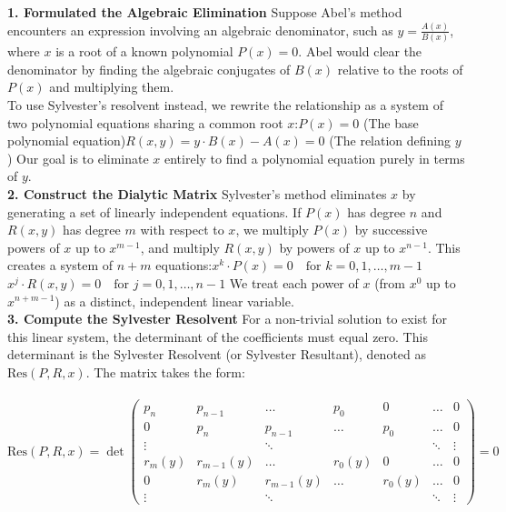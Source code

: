 {\bf 1. Formulated the Algebraic Elimination} 
Suppose Abel's method encounters an expression involving an algebraic denominator, such as \(y = \frac{A(x)}{B(x)}\), where \(x\) is a root of a known polynomial \(P(x) = 0\). 
Abel would clear the denominator by finding the algebraic conjugates of \(B(x)\) relative to the roots of \(P(x)\) and multiplying them.\\

To use Sylvester's resolvent instead, we rewrite the relationship as a system of two polynomial equations sharing a common root \(x\):\(P(x) = 0\)
(The base polynomial equation)\(R(x, y) = y \cdot B(x) - A(x) = 0\) (The relation defining \(y\))
Our goal is to eliminate \(x\) entirely to find a polynomial equation purely in terms of \(y\).\\

{\bf 2. Construct the Dialytic Matrix}
Sylvester's method eliminates \(x\) by generating a set of linearly independent equations. 
If \(P(x)\) has degree \(n\) and \(R(x, y)\) has degree \(m\) with respect to \(x\), we multiply \(P(x)\) by successive powers of \(x\) up to \(x^{m-1}\), 
and multiply \(R(x, y)\) by powers of \(x\) up to \(x^{n-1}\).
This creates a system of \(n + m\) equations:\(x^{k}\cdot P(x)=0\quad \text{for\ }k=0,1,\dots ,m-1\)\(x^{j}\cdot R(x,y)=0\quad \text{for\ }j=0,1,\dots ,n-1\)
We treat each power of \(x\) (from \(x^{0}\) up to \(x^{n+m-1}\)) as a distinct, independent linear variable.\\

{\bf 3. Compute the Sylvester Resolvent}
For a non-trivial solution to exist for this linear system, the determinant of the coefficients must equal zero. 
This determinant is the Sylvester Resolvent (or Sylvester Resultant), denoted as \(\text{Res}(P, R, x)\). The matrix takes the form: \\ \\
\[\text{Res}(P,R,x)=\det \left(
\begin{matrix}p_{n}&p_{n-1}&\dots &p_{0}&0&\dots &0\\ 0&p_{n}&p_{n-1}&\dots &p_{0}&\dots &0\\ 
\vdots &&\ddots &&&\ddots &\vdots \\ 
r_{m}(y)&r_{m-1}(y)&\dots &r_{0}(y)&0&\dots &0\\ 
0&r_{m}(y)&r_{m-1}(y)&\dots &r_{0}(y)&\dots &0\\ \vdots &&\ddots &&&\ddots &\vdots 
\end{matrix}\right)=0\] \\

